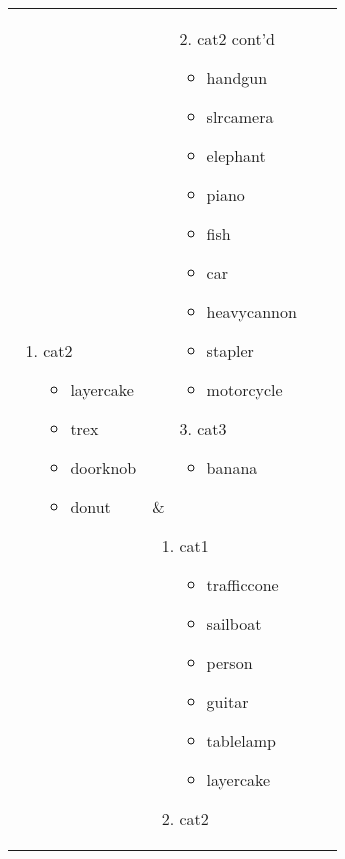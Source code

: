 \documentclass[12pt,twoside]{naturefigs}
\newif\myifpdf
\begin{document}
\begin{figure}
\begin{tabular}{llll}
{\begin{enumerate}
\begin{itemize}[leftmargin=*]
	\item sailboat
	\item person
	\item guitar
	\item tablelamp
	\item chair
	\end{itemize}
	\item cat2
	\begin{itemize}[leftmargin=*]
	\item layercake
	\item trex
	\item doorknob
	\item donut
	\end{itemize}
	\end{enumerate}
	} & 
	 \parbox[t]{1.4in}{\raggedright 	{} \small
	\begin{enumerate}
	\item[2.] cat2 cont'd
	\begin{itemize}[leftmargin=*]
	\item handgun
	\item slrcamera
	\item elephant
	\item piano
	\item fish
	\item car
	\item heavycannon
	\item stapler
	\item motorcycle
	\end{itemize}
	\item[3.] cat3
	\begin{itemize}[leftmargin=*]
	\item banana
	\end{itemize}
	\end{enumerate}
	} & 
	 \parbox[t]{1.4in}{\raggedright  	{} \small
	\begin{enumerate}
	\item cat1
	\begin{itemize}[leftmargin=*]
	\item trafficcone
	\item sailboat
	\item person
	\item guitar
	\item tablelamp
	\item layercake
	\end{itemize}
	\item cat2
	\begin{itemize}[leftmargin=*]

\end{itemize}
\end{enumerate}}
\end{tabular}
\end{figure}
\end{document}
